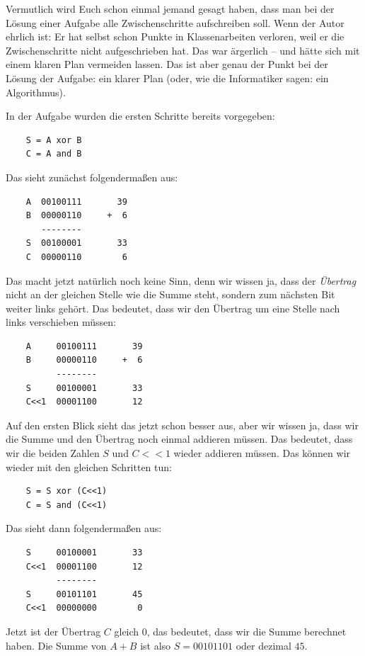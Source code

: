      Vermutlich wird Euch schon einmal jemand gesagt haben, dass man bei der Lösung einer Aufgabe alle Zwischenschritte aufschreiben soll. Wenn der Autor ehrlich ist: Er hat selbst schon Punkte in Klassenarbeiten verloren, weil er die Zwischenschritte nicht aufgeschrieben hat. Das war ärgerlich – und hätte sich mit einem klaren Plan vermeiden lassen. Das ist aber genau der Punkt bei der Lösung der Aufgabe: ein klarer Plan (oder, wie die Informatiker sagen: ein Algorithmus).

      In der Aufgabe wurden die ersten Schritte bereits vorgegeben:
\begin{verbatim}
    S = A xor B
    C = A and B
\end{verbatim}
      Das sieht zunächst folgendermaßen aus:
\begin{lstlisting}
    A  00100111       39
    B  00000110     +  6
       --------
    S  00100001       33
    C  00000110        6
\end{lstlisting}
      Das macht jetzt natürlich noch keine Sinn, denn wir wissen ja, dass der \textit{Übertrag} nicht an der gleichen Stelle wie die Summe steht, sondern zum nächsten Bit weiter links gehört. Das bedeutet, dass wir den Übertrag um eine Stelle nach links verschieben müssen:
\begin{lstlisting}
    A     00100111       39
    B     00000110     +  6
          --------
    S     00100001       33
    C<<1  00001100       12
\end{lstlisting}
      Auf den ersten Blick sieht das jetzt schon besser aus, aber wir wissen ja, dass wir die Summe und den Übertrag noch einmal addieren müssen. Das bedeutet, dass wir die beiden Zahlen $S$ und $C<<1$ wieder addieren müssen. Das können wir wieder mit den gleichen Schritten tun:
\begin{verbatim}
    S = S xor (C<<1)
    C = S and (C<<1)
\end{verbatim}
      Das sieht dann folgendermaßen aus:
\begin{lstlisting}
    S     00100001       33
    C<<1  00001100       12
          --------
    S     00101101       45
    C<<1  00000000        0
\end{lstlisting}
      Jetzt ist der Übertrag $C$ gleich 0, das bedeutet, dass wir die Summe berechnet haben. Die Summe von $A+B$ ist also $S=00101101$ oder dezimal $45$.

